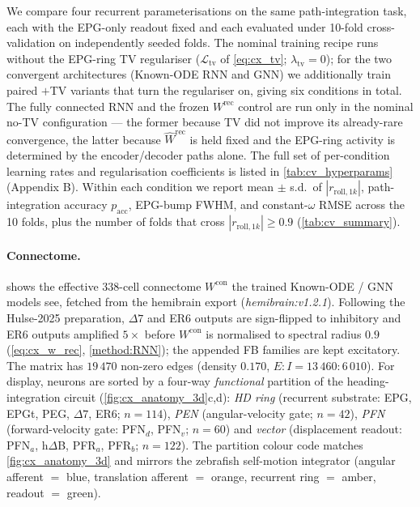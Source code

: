 \documentclass[11pt]{article}
\begin{document}
We compare four recurrent parameterisations on the same path-integration task, each with the EPG-only readout fixed and each evaluated under 10-fold cross-validation on independently seeded folds. The nominal training recipe runs without the EPG-ring TV regulariser ($\mathcal{L}_{\mathrm{tv}}$ of \cref{eq:cx_tv}; $\lambda_{\mathrm{tv}} = 0$); for the two convergent architectures (Known-ODE RNN and GNN) we additionally train paired $+$TV variants that turn the regulariser on, giving six conditions in total. The fully connected RNN and the frozen $W^{\mathrm{rec}}$ control are run only in the nominal no-TV configuration --- the former because TV did not improve its already-rare convergence, the latter because $\hat W^{\mathrm{rec}}$ is held fixed and the EPG-ring activity is determined by the encoder/decoder paths alone. The full set of per-condition learning rates and regularisation coefficients is listed in \cref{tab:cv_hyperparams} (Appendix B). Within each condition we report mean $\pm$ s.d.\ of $|r_{\mathrm{roll},1k}|$, path-integration accuracy $p_{\mathrm{acc}}$, EPG-bump FWHM, and constant-$\omega$ RMSE across the 10 folds, plus the number of folds that cross $|r_{\mathrm{roll},1k}| \ge 0.9$ (\cref{tab:cv_summary}).

\begin{table}[H]
  \centering
  \footnotesize
  
  \caption{\textbf{10-fold CV summary across the six trained
  conditions.} $n_{\mathrm{conv}}/10$ is the number of folds with
  $|r_{\mathrm{roll},1k}| \ge 0.9$ on a held-out constant-$\omega$
  rollout. The remaining columns are mean $\pm$ s.d.\ across the 10
  folds of the same condition. The same numbers drive every per-model
  paragraph below; the corresponding per-fold $W^{\mathrm{rec}}$
  analysis is given in \cref{fig:w_rec_comparison}.}
  \label{tab:cv_summary}
\end{table}

\paragraph{Connectome.}
 shows the effective $338$-cell connectome
$W^{\mathrm{con}}$ the trained Known-ODE / GNN models see, fetched from the
hemibrain export (\emph{hemibrain:v1.2.1}). Following the Hulse-2025
preparation, $\Delta7$ and ER6 outputs are sign-flipped to inhibitory and ER6
outputs amplified $5\times$ before $W^{\mathrm{con}}$ is normalised to spectral
radius $0.9$ (\cref{eq:cx_w_rec}, \cref{method:RNN}); the appended FB families
are kept excitatory. The matrix has $19\,470$ non-zero edges (density $0.170$,
$E\!:\!I = 13\,460\!:\!6\,010$). For display, neurons are sorted by a four-way
\emph{functional} partition of the heading-integration circuit
(\cref{fig:cx_anatomy_3d}c,d): \emph{HD ring} (recurrent substrate: EPG, EPGt,
PEG, $\Delta7$, ER6; $n=114$), \emph{PEN} (angular-velocity gate; $n=42$),
\emph{PFN} (forward-velocity gate: PFN$_d$, PFN$_v$; $n=60$) and \emph{vector}
(displacement readout: PFN$_a$, h$\Delta$B, PFR$_a$, PFR$_b$; $n=122$). The
partition colour code matches \cref{fig:cx_anatomy_3d} and mirrors the
zebrafish self-motion integrator (angular afferent $=$ blue, translation
afferent $=$ orange, recurrent ring $=$ amber, readout $=$ green).
\end{document}
